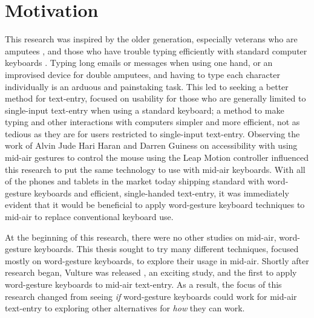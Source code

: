 \section{Motivation}
This research was inspired by the older generation, especially veterans who are amputees \cite{ref_amputee_EMG_keyboard}, and those who have trouble typing efficiently with standard computer keyboards \cite{ref_aging_and_technology,ref_review_computer_input_devices_older_users}. Typing long emails or messages when using one hand, or an improvised device for double amputees, and having to type each character individually is an arduous and painstaking task. This led to seeking a better method for text-entry, focused on usability for those who are generally limited to single-input text-entry when using a standard keyboard; a method to make typing and other interactions with computers simpler and more efficient, not as tedious as they are for users restricted to single-input text-entry. Observing the work of Alvin Jude Hari Haran and Darren Guiness on accessibility with using mid-air gestures to control the mouse using the Leap Motion controller \cite{ref_leap_motion,ref_alvin_thesis,ref_darren_thesis} influenced this research to put the same technology to use with mid-air keyboards. With all of the phones and tablets in the market today shipping standard with word-gesture keyboards and efficient, single-handed text-entry, it was immediately evident that it would be beneficial to apply word-gesture keyboard techniques to mid-air to replace conventional keyboard use.

At the beginning of this research, there were no other studies on mid-air, word-gesture keyboards. This thesis sought to try many different techniques, focused mostly on word-gesture keyboards, to explore their usage in mid-air. Shortly after research began, Vulture was released \cite{ref_vulture}, an exciting study, and the first to apply word-gesture keyboards to mid-air text-entry. As a result, the focus of this research changed from seeing \textit{if} word-gesture keyboards could work for mid-air text-entry to exploring other alternatives for \textit{how} they can work.

